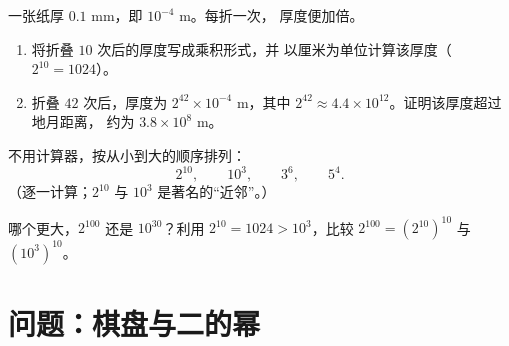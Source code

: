 \begin{exercise}[$\star\star$]\label{exo:g8:powers:9}
一张纸厚 $0.1$ mm，即 $10^{-4}$ m。每折一次，
厚度便加倍。
\begin{enumerate}
  \item 将折叠 $10$ 次后的厚度写成乘积形式，并
        以厘米为单位计算该厚度（$2^{10} = 1024$）。
  \item 折叠 $42$ 次后，厚度为
        $2^{42} \times 10^{-4}$ m，其中 $2^{42} \approx 4.4 \times
        10^{12}$。证明该厚度超过地月距离，
        约为 $3.8 \times 10^8$ m。
\end{enumerate}
\end{exercise}

\begin{exercise}[$\star\star$]\label{exo:g8:powers:10}
不用计算器，按从小到大的顺序排列：
\[
2^{10}, \qquad 10^3, \qquad 3^6, \qquad 5^4 .
\]
（逐一计算；$2^{10}$ 与 $10^3$ 是著名的“近邻”。）
\end{exercise}

\begin{exercise}[$\star\star\star$]\label{exo:g8:powers:11}
哪个更大，$2^{100}$ 还是 $10^{30}$？利用
$2^{10} = 1024 > 10^3$，比较
$2^{100} = \left(2^{10}\right)^{10}$ 与
$\left(10^3\right)^{10}$。
\end{exercise}

\section{问题：棋盘与二的幂}

